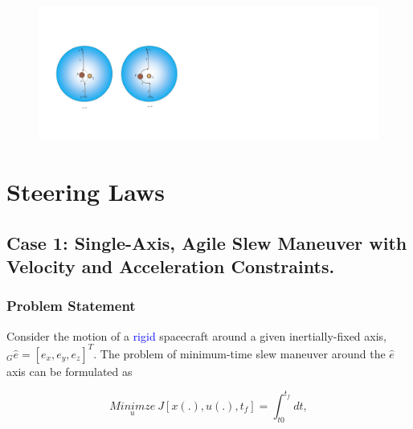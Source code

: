 \documentclass[letterpaper, preprint, paper,11pt]{AAS}	%
\begin{document}

		\begin{figure}[H]
			\begin{center}
			\includegraphics[width=6in]{./Figures/SASSchematic3}
			\end{center}
		\end{figure}
	

\section{Steering Laws} 

	\subsection{Case 1: Single-Axis, Agile Slew Maneuver with Velocity and Acceleration Constraints.}	 
	
	
		\subsubsection{Problem Statement}
		
			Consider the motion of a \textcolor{blue}{rigid} spacecraft around a given inertially-fixed axis, $_G\hat{e}=[e_x,e_y,e_z]^T$. The problem of minimum-time slew maneuver around the $\hat{e}$ axis can be formulated as
			
			\begin{equation}\label{costfunction}
				\underset{u}{Minimze}\ J[x(.), u(.), t_f]=\int_{t0}^{t_f} dt,
			\end{equation}
			
\end{document}
